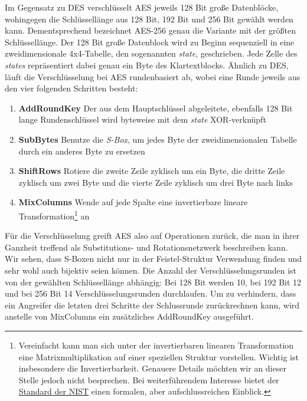 Im Gegensatz zu DES verschlüsselt AES jeweils 128 Bit große Datenblöcke, wohingegen die Schlüssellänge aus 128 Bit, 192 Bit und 256 Bit gewählt werden kann. Dementsprechend bezeichnet AES-256 genau die Variante mit der größten Schlüssellänge. Der 128 Bit große Datenblock wird zu Beginn sequenziell in eine zweidimensionale 4x4-Tabelle, den sogenannten \textit{state}, geschrieben. Jede Zelle des \textit{states} repräsentiert dabei genau ein Byte des Klartextblocks. Ähnlich zu DES, läuft die Verschlüsselung bei AES rundenbasiert ab, wobei eine Runde jeweils aus den vier folgenden Schritten besteht:

\begin{enumerate}
	\item \textbf{AddRoundKey} \small{Der aus dem Hauptschlüssel abgeleitete, ebenfalls 128 Bit lange Rundenschlüssel wird byteweise mit dem \textit{state} XOR-verknüpft}
	\item \textbf{SubBytes} \small{Benutze die \textit{S-Box}, um jedes Byte der zweidimensionalen Tabelle durch ein anderes Byte zu ersetzen}
	\item \textbf{ShiftRows} \small{Rotiere die zweite Zeile zyklisch um ein Byte, die dritte Zeile zyklisch um zwei Byte und die vierte Zeile zyklisch um drei Byte nach links}
	\item \textbf{MixColumns} \small{Wende auf jede Spalte eine invertierbare lineare Transformation\footnote{Vereinfacht kann man sich unter der invertierbaren linearen Transformation eine Matrixmultiplikation auf einer speziellen Struktur vorstellen. Wichtig ist insbesondere die Invertierbarkeit. Genauere Details möchten wir an dieser Stelle jedoch nicht besprechen. Bei weiterführendem Interesse bietet der \href{http://csrc.nist.gov/publications/fips/fips197/fips-197.pdf}{Standard der NIST} einen formalen, aber aufschlussreichen Einblick.} an}
\end{enumerate}

Für die Verschlüsselung greift AES also auf Operationen zurück, die man in ihrer Ganzheit treffend als Substitutions- und Rotationsnetzwerk beschreiben kann. Wir sehen, dass S-Boxen nicht nur in der Feistel-Struktur Verwendung finden und sehr wohl auch bijektiv seien können.
Die Anzahl der Verschlüsselungsrunden ist von der gewählten Schlüssellänge abhängig: Bei 128 Bit werden 10, bei 192 Bit 12 und bei 256 Bit 14 Verschlüsselungsrunden durchlaufen. Um zu verhindern, dass ein Angreifer die letzten drei Schritte der Schlussrunde zurückrechnen kann, wird anstelle von MixColumns ein zusätzliches AddRoundKey ausgeführt.

